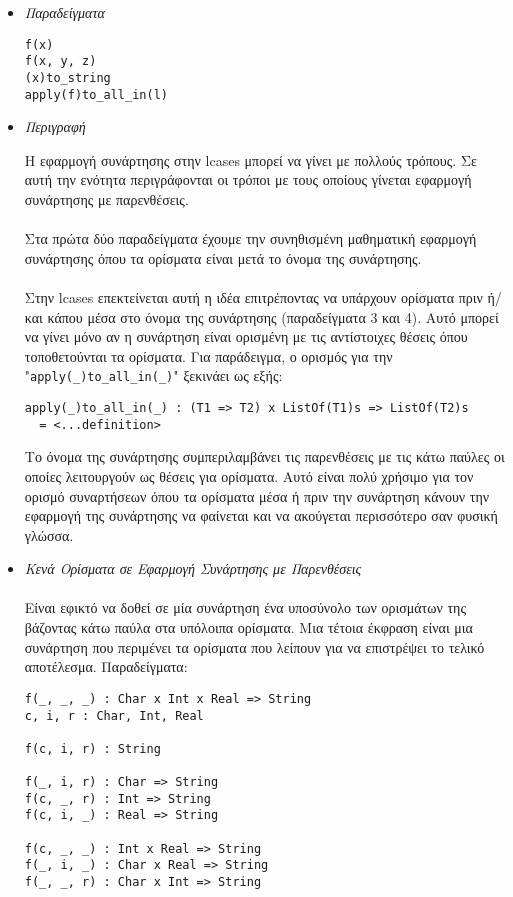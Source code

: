 \documentclass[diploma]{softlab-thesis}
\begin{document}
\begin{itemize}
\item \textit{Παραδείγματα}

\begin{verbatim}
f(x)
f(x, y, z)
(x)to_string
apply(f)to_all_in(l)
\end{verbatim}

\item \textit{Περιγραφή}

Η εφαρμογή συνάρτησης στην lcases μπορεί να γίνει με πολλούς τρόπους.  Σε αυτή
την ενότητα περιγράφονται οι τρόποι με τους οποίους γίνεται εφαρμογή συνάρτησης
με παρενθέσεις.
\\\\
Στα πρώτα δύο παραδείγματα έχουμε την συνηθισμένη μαθηματική εφαρμογή
συνάρτησης όπου τα ορίσματα είναι μετά το όνομα της συνάρτησης.
\\\\
Στην lcases επεκτείνεται αυτή η ιδέα επιτρέποντας να υπάρχουν ορίσματα πριν
ή/και κάπου μέσα στο όνομα της συνάρτησης (παραδείγματα 3 και 4). Αυτό μπορεί
να γίνει μόνο αν η συνάρτηση είναι ορισμένη με τις αντίστοιχες θέσεις όπου
τοποθετούνται τα ορίσματα. Για παράδειγμα, ο ορισμός για την
"\verb|apply(_)to_all_in(_)|" ξεκινάει ως εξής:
\begin{verbatim}
apply(_)to_all_in(_) : (T1 => T2) x ListOf(T1)s => ListOf(T2)s
  = <...definition>
\end{verbatim}
Το όνομα της συνάρτησης συμπεριλαμβάνει τις παρενθέσεις με τις κάτω παύλες οι
οποίες λειτουργούν ως θέσεις για ορίσματα.  Αυτό είναι πολύ χρήσιμο για τον
ορισμό συναρτήσεων όπου τα ορίσματα μέσα ή πριν την συνάρτηση κάνουν την
εφαρμογή της συνάρτησης να φαίνεται και να ακούγεται περισσότερο σαν φυσική
γλώσσα.

\item \textit{Κενά Ορίσματα σε Εφαρμογή Συνάρτησης με Παρενθέσεις}
\\\\
Είναι εφικτό να δοθεί σε μία συνάρτηση ένα υποσύνολο των ορισμάτων της βάζοντας
κάτω παύλα στα υπόλοιπα ορίσματα. Μια τέτοια έκφραση είναι μια συνάρτηση που
περιμένει τα ορίσματα που λείπουν για να επιστρέψει το τελικό αποτέλεσμα.
Παραδείγματα:
\begin{verbatim}
f(_, _, _) : Char x Int x Real => String
c, i, r : Char, Int, Real

f(c, i, r) : String

f(_, i, r) : Char => String
f(c, _, r) : Int => String
f(c, i, _) : Real => String

f(c, _, _) : Int x Real => String
f(_, i, _) : Char x Real => String
f(_, _, r) : Char x Int => String
\end{verbatim}

\end{itemize}
\end{document}

